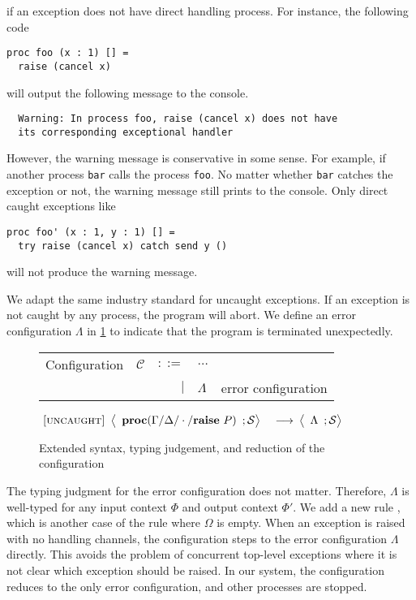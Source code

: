 \documentclass[12pt, openany]{memoir}
\newcommand*{\craise}[1]{\textbf{raise}\ #1}
\newcommand*{\procObj}[4]{\textbf{proc}(#1/#2/#3/#4)}
\newcommand*{\config}[0]{\mathcal{C}}
\newcommand*{\cancelSet}[0]{\mathcal{S}}
\begin{document}
if an exception does not have direct handling process. For instance, the following code 
\begin{lstlisting}
proc foo (x : 1) [] = 
  raise (cancel x)
\end{lstlisting}
will output the following message to the console.
\begin{verbatim}
  Warning: In process foo, raise (cancel x) does not have 
  its corresponding exceptional handler
\end{verbatim}
However, the warning message is conservative in some sense. For example,
if another process \texttt{bar} calls the process \texttt{foo}. No matter whether \texttt{bar} catches the exception or not,  
the warning message still prints to the console. Only direct caught exceptions like
\begin{lstlisting}
proc foo' (x : 1, y : 1) [] =
  try raise (cancel x) catch send y ()
\end{lstlisting}
will not produce the warning message.

We adapt the same industry standard for uncaught exceptions. If an exception is not caught by any process,
the program will abort. We define an error configuration $\Lambda$ in \cref{fig:abortcfg} to indicate that the program is terminated unexpectedly.
\begin{figure}[H]
  \centering
  \begin{tabular}{r r r l l}
    Configuration & $\config$ & $::=$ & $\ldots$ &  \\
    & & $\mid$ & $\Lambda$ & error configuration
   \end{tabular}
   \begin{rules}
   \end{rules}
   \vspace*{-1cm}
   \begin{alignat}{4}
    \label{uncaught} \textsc{[uncaught]} & ~ 
    \Braket{
      \begin{array}{l}
        \procObj{\Gamma}{\Delta}{\cdot}{\craise{P}}
      \end{array}
      ; \cancelSet
    } & ~ \longrightarrow & ~ 
    \Braket{
      \begin{array}{l}
        \Lambda
      \end{array}
      ; \cancelSet
    } \tag*{}
  \end{alignat}
  \caption{Extended syntax, typing judgement, and reduction of the configuration}
  \label{fig:abortcfg}
\end{figure}
The typing judgment for the error configuration does not matter. Therefore, $\Lambda$ is well-typed for any input context $\Phi$ and output context $\Phi'$.
We add a new rule , which is another case of the  rule where $\Omega$ is empty.
When an exception is raised with no handling channels, the configuration steps to the error configuration $\Lambda$ directly.
This avoids the problem of concurrent top-level exceptions where it is not clear which exception should be raised.
In our system, the configuration reduces to the only error configuration, and other processes are stopped.
\end{document}
